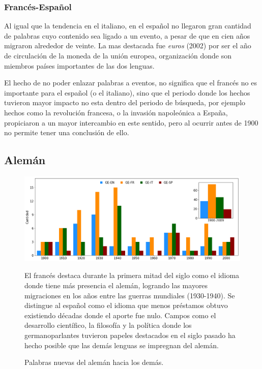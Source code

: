 \subsubsection*{Francés-Español}%

Al igual que la tendencia en el italiano, en el español no llegaron gran cantidad de palabras cuyo contenido sea ligado a un evento, a pesar de que en cien años migraron alrededor de veinte. La mas destacada fue \textit{euros} (2002) por ser el año de circulación de la moneda de la unión europea, organización donde son miembros países importantes de las dos lenguas. 

El hecho de no poder enlazar palabras a eventos, no significa que el francés no es importante para el español (o el italiano), sino que el periodo donde los hechos tuvieron mayor impacto no esta dentro del periodo de búsqueda,  por ejemplo hechos como la revolución francesa, o la invasión napoleónica a España, propiciaron a un mayor intercambio en este sentido, pero al ocurrir antes de 1900 no permite tener una conclusión de ello. 


\clearpage
\subsection{Alemán}%

\begin{figure}[h!]
	\centering
	\includegraphics[scale=.38]{Cap_3/NC_GE.png}
	\label{fig.NC_GE}
	\caption{Palabras nuevas del alemán hacia los demás.}
	\smallskip
	\small
	El francés destaca durante la primera mitad del siglo como el idioma donde tiene más presencia el alemán, logrando las mayores migraciones en los años entre las guerras mundiales (1930-1940). Se distingue al español como el idioma que menos préstamos obtuvo  existiendo décadas donde el aporte fue nulo.  Campos como el desarrollo científico, la filosofía  y la política donde los germanoparlantes tuvieron papeles destacados en el siglo pasado ha hecho posible que las demás lenguas se impregnan del alemán.
\end{figure}




